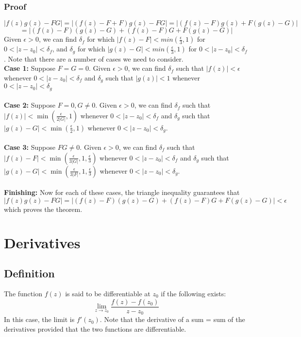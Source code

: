 \documentclass[../main.tex]{subfiles}
\begin{document}
        \subsubsection{Proof}
            $$|f(z)g(z)-FG|=|(f(z)-F+F)g(z)-FG|=|(f(z)-F)g(z)+F(g(z)-G)|$$
            $$=|(f(z)-F)(g(z)-G)+(f(z)-F)G+F(g(z)-G)|$$
            Given $\epsilon > 0$, we can find $\delta_{f}$ for which $|f(z)-F|<min(\frac{\epsilon}{3}, 1)$ for $0<|z-z_{0}|<\delta_{f}$,
            and $\delta_{g}$ for which $|g(z)-G|<min(\frac{\epsilon}{3}, 1)$ for $0<|z-z_{0}|<\delta_{f}$.
            Note that there are a number of cases we need to consider.
            \\
            \textbf{Case 1:}
            Suppose $F=G=0$. Given $\epsilon>0$, we can find $\delta_{f}$ such that $|f(z)|<\epsilon$ whenever $0<|z-z_{0}|<\delta_{f}$
            and $\delta_{g}$ such that $|g(z)|<1$ whenever $0<|z-z_{0}|<\delta_{g}$
            \\\\
            \textbf{Case 2:}
            Suppose $F=0,G\neq 0$. Given $\epsilon>0$, we can find $\delta_{f}$ such that $|f(z)|<\min(\frac{\epsilon}{2|G|}, 1)$ whenever $0<|z-z_{0}|<\delta_{f}$
            and $\delta_{g}$ such that $|g(z)-G|<\min(\frac{\epsilon}{2},1)$ whenever $0<|z-z_{0}|<\delta_{g}$.
            \\\\
            \textbf{Case 3:}
            Suppose $FG\neq 0$. Given $\epsilon>0$, we can find $\delta_{f}$ such that $|f(z)-F|<\min(\frac{\epsilon}{3|G|}, 1, \frac{\epsilon}{3})$ whenever $0<|z-z_{0}|<\delta_{f}$
            and $\delta_{g}$ such that $|g(z)-G|<\min(\frac{\epsilon}{3|F|},1,\frac{\epsilon}{3})$ whenever $0<|z-z_{0}|<\delta_{g}$.
            \\\\
            \textbf{Finishing:}
            Now for each of these cases, the triangle inequality guarantees that $|f(z)g(z)-FG|=|(f(z)-F)(g(z)-G)+(f(z)-F)G+F(g(z)-G)|<\epsilon$ which proves the theorem.

\section{Derivatives}
    \subsection{Definition}
        The function $f(z)$ is said to be differentiable at $z_{0}$ if the following exists:
        $$\lim_{z\rightarrow z_{0}}\frac{f(z)-f(z_{0})}{z-z_{0}}$$
        In this case, the limit is $f'(z_{0})$. Note that the derivative of a sum = sum of the derivatives
        provided that the two functions are differentiable.
\end{document}
